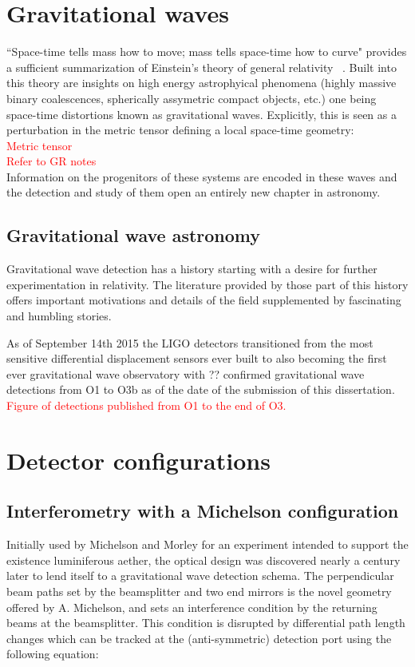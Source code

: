 \section{Gravitational waves}
``Space-time tells mass how to move; mass tells space-time how to curve" provides a sufficient summarization of Einstein's theory of general relativity ~\cite{Misner1973}. Built into this theory are insights on high energy astrophyical phenomena (highly massive binary coalescences, spherically assymetric compact objects, etc.) one being space-time distortions known as gravitational waves. Explicitly, this is seen as a perturbation in the metric tensor defining a local space-time geometry:
\\
\textcolor{red}{Metric tensor}
\\
\textcolor{red}{Refer to GR notes}
\\
Information on the progenitors of these systems are encoded in these waves and the detection and study of them open an entirely new chapter in astronomy.
\subsection{Gravitational wave astronomy}
Gravitational wave detection has a history starting with a desire for further experimentation in relativity. The literature provided by those part of this history offers important motivations and details of the field supplemented by fascinating and humbling stories.


As of September 14th 2015 the LIGO detectors transitioned from the most sensitive differential displacement sensors ever built to also becoming the first ever gravitational wave observatory with ?? confirmed gravitational wave detections from O1 to O3b as of the date of the submission of this dissertation. 
\textcolor{red}{Figure of detections published from O1 to the end of O3.}
\newpage
\section{Detector configurations}
\subsection{Interferometry with a Michelson configuration}
Initially used by Michelson and Morley for an experiment intended to support the existence luminiferous aether, the optical design was discovered nearly a century later to lend itself to a gravitational wave detection schema. The perpendicular beam paths set by the beamsplitter and two end mirrors is the novel geometry offered by A. Michelson, and sets an interference condition by the returning beams at the beamsplitter. This condition is disrupted by differential path length changes which can be tracked at the (anti-symmetric) detection port using the following equation:

